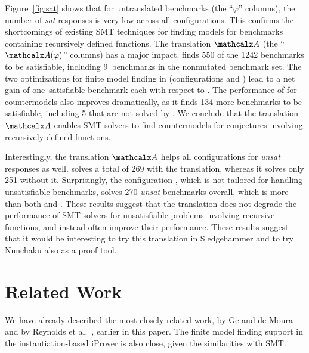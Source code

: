 Figure~\ref{fig:sat} shows that for untranslated benchmarks (the ``$\varphi$''
columns), the number of \emph{sat} responses is very low across all
configurations. This confirms the shortcomings of existing SMT techniques for
finding models for benchmarks containing recursively defined functions.
%
The translation $\conv$ (the ``$\conv(\varphi)$'' columns) has a major
impact. \cvcf finds 550 of the 1242 benchmarks to be satisfiable,
including 9~benchmarks in the nonmutated \leon benchmark set. 
The two optimizations for finite model finding in \cvc (configurations \cvcfe and \cvcfm) 
lead to a net gain of one~satisfiable benchmark each with respect to \cvcf.
The performance of \ziiib for countermodels also improves dramatically, as it
finds 134 more benchmarks to be satisfiable, including 5 that are not solved by \cvcf.
%
We conclude that the translation $\conv$ enables SMT
solvers to find countermodels for conjectures involving recursively defined
functions.  %

Interestingly,
the translation $\conv$ helps all configurations for \emph{unsat} responses as well.
\ziii solves a total of 269 with the translation, whereas it solves only 251 without it.
Surprisingly,
the configuration \cvcf, which is not tailored for handling unsatisfiable benchmarks,
solves 270 \emph{unsat} benchmarks overall, which is more than both \cvcd and \ziii.
These results suggest that the translation does not degrade the performance
of SMT solvers for unsatisfiable problems involving recursive functions,
and instead often improve their performance. 
These results suggest that it would be interesting to try this translation
in Sledgehammer \cite{blanchette-et-al-2013-smt} and to try Nunchaku also as a
proof tool.

\section{Related Work}
\label{sec:related-work}

We have already described the most closely related work, by Ge and de Moura
\cite{GeDeM-CAV-09} and by Reynolds et al.\
\cite{ReyEtAl-1-RR-13,reynolds-et-al-2013}, earlier in this paper.
The finite model finding support in the instantiation-based iProver
\cite{korovin-2013} is also close, given the similarities with SMT.


